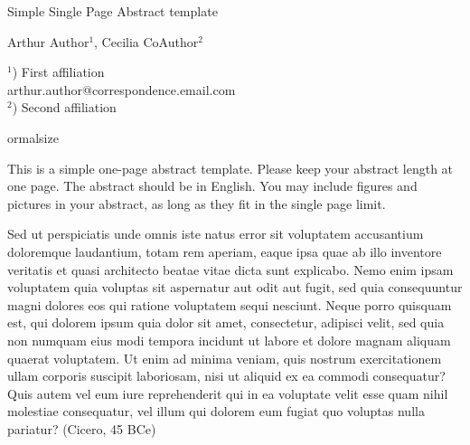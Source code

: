 \documentclass[a4paper]{article}
\begin{document}

\Large
 \begin{center}
Simple Single Page Abstract template\\ 

\hspace{10pt}

\large
Arthur Author$^1$, Cecilia CoAuthor$^2$ \\

\hspace{10pt}

\small  
$^1$) First affiliation\\
arthur.author@correspondence.email.com\\
$^2$) Second affiliation

\end{center}

\hspace{10pt}


ormalsize

This is a simple one-page abstract template. Please keep your abstract length at one page. The abstract should be in English. You may include figures and pictures in your abstract, as long as they fit in the single page limit.

Sed ut perspiciatis unde omnis iste natus error sit voluptatem accusantium doloremque laudantium, totam rem aperiam, eaque ipsa quae ab illo inventore veritatis et quasi architecto beatae vitae dicta sunt explicabo. Nemo enim ipsam voluptatem quia voluptas sit aspernatur aut odit aut fugit, sed quia consequuntur magni dolores eos qui ratione voluptatem sequi nesciunt. Neque porro quisquam est, qui dolorem ipsum quia dolor sit amet, consectetur, adipisci velit, sed quia non numquam eius modi tempora incidunt ut labore et dolore magnam aliquam quaerat voluptatem. Ut enim ad minima veniam, quis nostrum exercitationem ullam corporis suscipit laboriosam, nisi ut aliquid ex ea commodi consequatur? Quis autem vel eum iure reprehenderit qui in ea voluptate velit esse quam nihil molestiae consequatur, vel illum qui dolorem eum fugiat quo voluptas nulla pariatur? (Cicero, 45 BCe)
\end{document}
